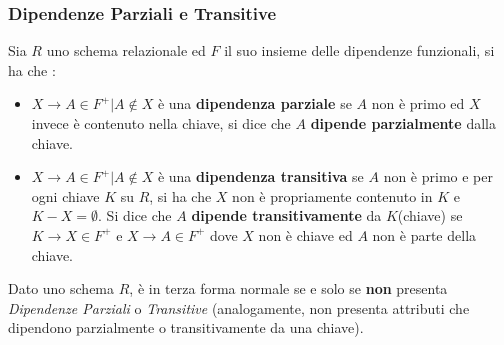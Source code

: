 \documentclass[12pt, letterpaper]{article}
\begin{document}
\subsubsection{Dipendenze Parziali e Transitive}
Sia \(R\) uno schema relazionale ed \(F\) il suo insieme delle dipendenze funzionali, si ha che :\begin{itemize}
    \item \(X\rightarrow A\in F^+|A\notin X\) è una \textbf{dipendenza parziale} se \(A\) non è primo ed 
    \(X\) invece è contenuto nella chiave, si dice che \(A\) \textbf{dipende parzialmente} dalla chiave.
    \item \(X\rightarrow A\in F^+|A\notin X\) è una \textbf{dipendenza transitiva} se \(A\) non è primo e 
    per ogni chiave \(K\) su \(R\), si ha che \(X\) non è propriamente contenuto in \(K\) e \(K-X=\emptyset\). Si dice 
    che \(A\) \textbf{dipende transitivamente} da \(K\)(chiave) se \(K\rightarrow X \in F^+\) e \(X\rightarrow A \in F^+\) dove 
    \(X\) non è chiave ed \(A\) non è parte della chiave.
\end{itemize}
Dato uno schema \(R\),  è in terza forma normale se e solo se  \textbf{non} presenta \textit{Dipendenze Parziali} o \textit{Transitive}
(analogamente, non presenta attributi che dipendono parzialmente o transitivamente da una chiave).
\end{document}
